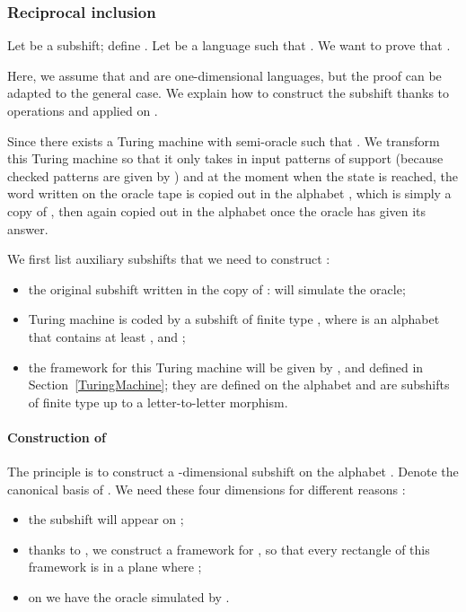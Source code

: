 \documentclass[proceedings]{stacs}
\theoremstyle{plain}\newtheorem{satz}[thm]{Satz}
\theoremstyle{definition}\newtheorem{crucial}[thm]{Crucial Definition}
\begin{document}
\subsubsection{Reciprocal inclusion}\label{recinclusion}

Let be a subshift; define . Let   be a language such that .  We want to prove that .  



Here, we assume that  and  are one-dimensional languages, but the proof can be adapted to the general case. We explain how to construct the subshift  thanks to operations  and  applied on .

Since  there exists a Turing machine  with semi-oracle  such that . We transform this Turing machine so that it only takes in input patterns of support  (because checked patterns are given by ) and at the moment when the state  is reached, the word written on the oracle tape is copied out in the alphabet , which is simply a copy of , then again copied out in the alphabet  once the oracle has given its answer.

We first list auxiliary subshifts that we need to construct  :

\begin{itemize}
\item the original subshift  written in the copy of :  will simulate the oracle;
\item Turing machine  is coded by a subshift of finite type , where  is an alphabet that contains at least ,  and ;
\item the framework for this Turing machine will be given by ,  and  defined in Section~\ref{TuringMachine}; they are defined on the alphabet  and are subshifts of finite type up to a letter-to-letter morphism.
\end{itemize}

\paragraph{\textbf{Construction of }}
The principle is to construct  a -dimensional subshift on the alphabet . Denote  the canonical basis of . We need these four dimensions for different reasons :
\begin{itemize}
\item the subshift  will appear on ;
\item thanks to , we construct a framework for , so that every rectangle of this framework is in a plane  where ;
\item on  we have the oracle simulated by .
\end{itemize}
\end{document}
